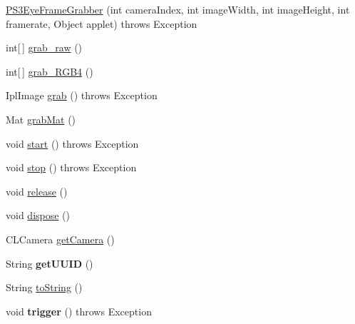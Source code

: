 \begin{DoxyCompactItemize}
\item 
\hyperlink{classairhockeyjava_1_1detection_1_1_p_s3_eye_frame_grabber_a1619dca629e2dd43fae5c232798d80a2}{P\+S3\+Eye\+Frame\+Grabber} (int camera\+Index, int image\+Width, int image\+Height, int framerate, Object applet)  throws Exception 
\item 
int\mbox{[}$\,$\mbox{]} \hyperlink{classairhockeyjava_1_1detection_1_1_p_s3_eye_frame_grabber_a03630eb3a8eabb2373cc4c43fcfae624}{grab\+\_\+raw} ()
\item 
int\mbox{[}$\,$\mbox{]} \hyperlink{classairhockeyjava_1_1detection_1_1_p_s3_eye_frame_grabber_af186fbe50cb2e310320882cdd7f73310}{grab\+\_\+\+R\+G\+B4} ()
\item 
Ipl\+Image \hyperlink{classairhockeyjava_1_1detection_1_1_p_s3_eye_frame_grabber_a0b0bf0ce6847d670d7893a4489515982}{grab} ()  throws Exception 
\item 
Mat \hyperlink{classairhockeyjava_1_1detection_1_1_p_s3_eye_frame_grabber_a44a3af9447994ebc7624eeca09e605de}{grab\+Mat} ()
\item 
void \hyperlink{classairhockeyjava_1_1detection_1_1_p_s3_eye_frame_grabber_aece96fd9b477b95fd74c687313143783}{start} ()  throws Exception 
\item 
void \hyperlink{classairhockeyjava_1_1detection_1_1_p_s3_eye_frame_grabber_a3e225d875694dd7c981591899c04b276}{stop} ()  throws Exception 
\item 
void \hyperlink{classairhockeyjava_1_1detection_1_1_p_s3_eye_frame_grabber_a09d5a3ea7d8ceadac6bb8d4167e215e5}{release} ()
\item 
void \hyperlink{classairhockeyjava_1_1detection_1_1_p_s3_eye_frame_grabber_a9f3974a40c7333163cf8a425515d248e}{dispose} ()
\item 
C\+L\+Camera \hyperlink{classairhockeyjava_1_1detection_1_1_p_s3_eye_frame_grabber_a548ea7978eeb0873f8328ecf843c9e81}{get\+Camera} ()
\item 
\hypertarget{classairhockeyjava_1_1detection_1_1_p_s3_eye_frame_grabber_a231c1d31d7374eeccdde8fd281510efb}{}String {\bfseries get\+U\+U\+I\+D} ()\label{classairhockeyjava_1_1detection_1_1_p_s3_eye_frame_grabber_a231c1d31d7374eeccdde8fd281510efb}

\item 
String \hyperlink{classairhockeyjava_1_1detection_1_1_p_s3_eye_frame_grabber_a85e5c637eaa9d90ea8478b716bfa93bf}{to\+String} ()
\item 
\hypertarget{classairhockeyjava_1_1detection_1_1_p_s3_eye_frame_grabber_ac7a7c3e2042b734fcf65e133be04a45b}{}void {\bfseries trigger} ()  throws Exception \label{classairhockeyjava_1_1detection_1_1_p_s3_eye_frame_grabber_ac7a7c3e2042b734fcf65e133be04a45b}

\end{DoxyCompactItemize}
